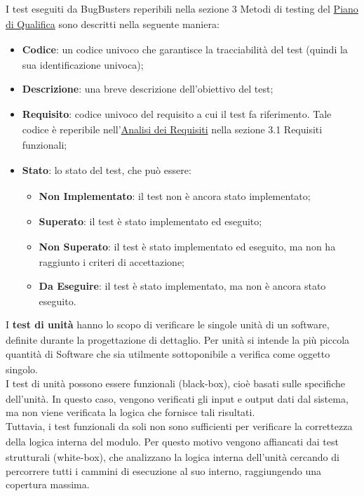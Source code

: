 \documentclass[a4paper,11pt]{article}
\newcommand{\G}{\textsubscript{\scalebox{0.6}{\textbf{G}}}}
\begin{document}
I test\G{} eseguiti da BugBusters reperibili nella sezione 3 Metodi di testing del \href{https://bugbustersunipd.github.io/DocumentazioneSWE/PB/PIANO%20DI%20QUALIFICA/Piano%20di%20Qualifica.pdf}{Piano di Qualifica\G{}} sono descritti nella seguente maniera:
\begin{itemize}
    \item \textbf{Codice}: un codice univoco che garantisce la tracciabilità del test\G{} (quindi la sua identificazione univoca);
    \item \textbf{Descrizione}: una breve descrizione dell'obiettivo del test\G{};
    \item \textbf{Requisito\G{}}: codice univoco del requisito\G{} a cui il test\G{} fa riferimento. Tale codice è reperibile nell'\href{https://bugbustersunipd.github.io/DocumentazioneSWE/PB/ANALISI%20DEI%20REQUISITI/Analisi%20dei%20Requisiti.pdf}{Analisi dei Requisiti\G{}} nella sezione 3.1 Requisiti\G{} funzionali\G{};
    \item \textbf{Stato}: lo stato del test\G{}, che può essere:
    \begin{itemize}
        \item \textbf{Non Implementato}: il test\G{} non è ancora stato implementato;
        \item \textbf{Superato}: il test\G{} è stato implementato ed eseguito;
        \item \textbf{Non Superato}: il test\G{} è stato implementato ed eseguito, ma non ha raggiunto i criteri di accettazione;
        \item \textbf{Da Eseguire}: il test\G{} è stato implementato, ma non è ancora stato eseguito.
    \end{itemize}
\end{itemize}
\subsubsubsection{Test\G{} di Unità{}}
I \textbf{test\G{} di unità}\G{} hanno lo scopo di verificare le singole unità di un software, definite durante la progettazione di dettaglio. Per unità si intende la più piccola quantità di Software che sia utilmente sottoponibile a verifica\G{} come oggetto singolo.\\
I test\G{} di unità{} possono essere funzionali (black-box), cioè basati sulle specifiche dell'unità.
In questo caso, vengono verificati gli input e output dati dal sistema, ma non viene verificata la logica che fornisce tali risultati.\\
Tuttavia, i test\G{} funzionali da soli non sono sufficienti per verificare la correttezza della logica interna del modulo\G{}. Per questo motivo vengono affiancati dai test\G{} strutturali (white-box), che analizzano la logica interna dell'unità cercando di percorrere tutti i cammini di esecuzione al suo interno, raggiungendo una copertura massima.\\
\end{document}
